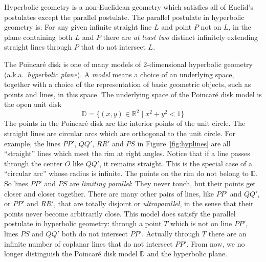 \documentclass[12pt]{article}
\begin{document}
Hyperbolic geometry is a non-Euclidean geometry which satisfies all of
Euclid's postulates except the parallel postulate. The parallel
postulate in hyperbolic geometry is: For any given infinite straight
line $L$ and point $P$ not on $L$, in the plane containing both $L$
and $P$ there are \emph{at least two} distinct infinitely extending
straight lines through $P$ that do not intersect $L$.


The Poincar\'e disk is one of many models of 2-dimensional hyperbolic
geometry (a.k.a.\ \emph{hyperbolic plane}). A \emph{model} means a
choice of an underlying space, together with a choice of the
representation of basic geometric objects, such as points and lines,
in this space. The underlying space of the Poincar\'e disk model is
the open unit disk
\begin{equation}
  \mathbb{D} = \{(x, y) \in \mathbb{R}^2\mid x^2 + y^2 < 1\}
\end{equation}
The points in the Poincar\'e disk are the interior points of the unit
circle. The straight lines are circular arcs which are orthogonal to
the unit circle. For example, the lines $PP'$, $QQ'$, $RR'$ and $PS$
in Figure~\ref{fig:hyplines} are all ``straight'' lines which meet the
rim at right angles. Notice that if a line passes through the center
$O$ like $QQ'$, it remains straight. This is the special case of a
``circular arc'' whose radius is infinite. The points on the rim do
not belong to $\mathbb{D}$. So lines $PP'$ and $PS$ are \emph{limiting
parallel}: They never touch, but their points get closer and closer
together. There are many other pairs of lines, like $PP'$ and $QQ'$,
or $PP'$ and $RR'$, that are totally disjoint or \emph{ultraparallel},
in the sense that their points never become arbitrarily close. This
model does satisfy the parallel postulate in hyperbolic geometry:
through a point $T$ which is not on line $PP'$, lines $PS$ and $QQ'$
both do not intersect $PP'$. Actually through $T$ there are an
infinite number of coplanar lines that do not intersect $PP'$. From
now, we no longer distinguish the Poincar\'e disk model $\mathbb{D}$
and the hyperbolic plane.
\end{document}
